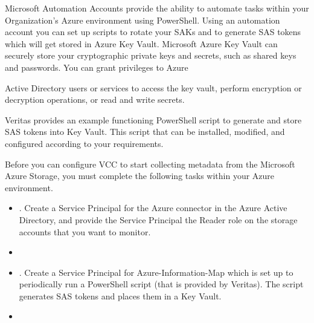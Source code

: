 \documentclass[letterpaper,10pt,english]{sphinxmanual}
\begin{document}
Microsoft Automation Accounts provide the ability to automate tasks within your Organization’s Azure environment using PowerShell. Using an automation account you can set up scripts to rotate your SAKs and to generate SAS tokens which will get stored in Azure Key Vault. Microsoft Azure Key Vault can securely store your cryptographic private keys and secrets, such as shared keys and passwords. You can grant privileges to Azure

Active Directory users or services to access the key vault, perform encryption or decryption operations, or read and write secrets.

Veritas provides an example functioning PowerShell script to generate and store SAS tokens into Key Vault. This script that can be installed, modified, and configured according to your requirements.

Before you can configure VCC to start collecting metadata from the Microsoft Azure Storage, you must complete the following tasks within your Azure environment.
\begin{itemize}
\item {} 
{\hyperref[\detokenize{mcdmp_app_ug:create-information-map-account}]{}}.
Create a Service Principal for the Azure connector in the Azure Active Directory, and provide the Service Principal the Reader role on the storage accounts that you want to monitor.

\item {} 
{\hyperref[\detokenize{mcdmp_app_ug:set-up-key-vault}]{}}

\item {} 
{\hyperref[\detokenize{mcdmp_app_ug:install-automation-script}]{}}.
Create a Service Principal for Azure-Information-Map which is set up to periodically run a PowerShell script (that is provided by Veritas). The script generates SAS tokens and places them in a Key Vault.

\item {} 
{\hyperref[\detokenize{mcdmp_app_ug:record-azure-account-details}]{}}

\end{itemize}
\end{document}
